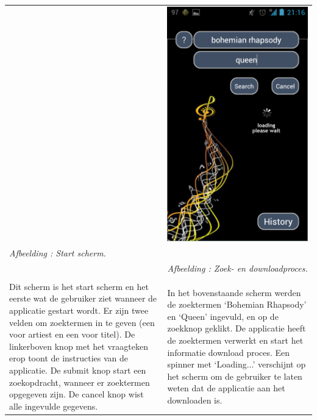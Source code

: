 \documentclass[11pt,a4paper]{article}
\newcounter{figc}
\newcommand{\increaseFigID} {%
   \stepcounter{figc}%
   \thefigc}
\newcommand{\figID}[1]{\small \textit{Afbeelding \increaseFigID : #1} \\ \normalsize}
\begin{document}
{\begin{tabular} {p{7cm} >{\centering\arraybackslash}p{7cm}@{\hskip 0.5in}}
		& \includegraphics[scale=0.28]{Pictures/Screenshot_2013-05-24-21-16-07.png} \\
		
		\centering \figID{Start scherm.} 
		& \figID{Zoek- en downloadproces.} 
		
		\vspace{1pt} & \vspace{1pt} \\
		
	\multicolumn{1}{p{7cm}|}{%
				Dit scherm is het start scherm en het eerste wat de gebruiker ziet wanneer de applicatie gestart wordt. Er zijn twee velden om zoektermen in te geven (een voor artiest en een voor titel). De linkerboven knop met het vraagteken erop toont de instructies van de applicatie. De submit knop start een zoekopdracht, wanneer er zoektermen opgegeven zijn. De cancel knop wist alle ingevulde gegevens. }
	&	
	\multicolumn{1}{p{7cm}} {%
				In het bovenstaande scherm werden de zoektermen `Bohemian Rhapsody' en `Queen' ingevuld, en op de zoekknop geklikt. De applicatie heeft de zoektermen verwerkt en start het informatie download proces. Een spinner met `Loading...' verschijnt op het scherm om de gebruiker te laten weten dat de applicatie aan het downloaden is. } 	
				\end{tabular} 
}
\end{document}
